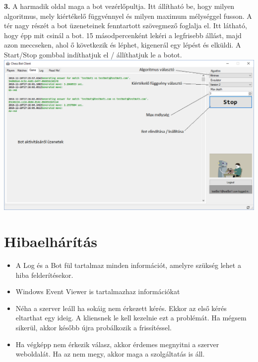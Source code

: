\documentclass[twoside, a4paper, 12pt]{book}
\begin{document}
\noindent \textbf{3.} A harmadik oldal maga a bot vezérlőpultja. Itt állítható be, hogy milyen algoritmus, mely kiértékelő függvénnyel és milyen maximum mélységgel fusson. A tér nagy részét a bot üzeneteinek fenntartott szövegmező foglalja el. Itt látható, hogy épp mit csinál a bot. 15 másodpercenként lekéri a legfrisebb állást, majd azon meccseken, ahol ő következik és léphet, kigenerál egy lépést és elküldi. A Start/Stop gombbal indíthatjuk el / állíthatjuk le a botot. \\
\includegraphics[width=1.0\textwidth]{img/botClient_3.png} \\

\section{Hibaelhárítás}
\begin{itemize}
	\item A Log és a Bot fül tartalmaz minden információt, amelyre szükség lehet a hiba felderítésekor.
	\item Windows Event Viewer is tartalmazhaz információkat
	\item Néha a szerver leáll ha sokáig nem érkezett kérés. Ekkor az első kérés eltarthat egy ideig. A kliensnek le kell kezelnie ezt a problémát. Ha mégsem sikerül, akkor később újra probálkozik a frissítéssel.
	\item Ha végképp nem érkezik válasz, akkor érdemes megnyitni a szerver weboldalát. Ha az nem megy, akkor maga a szolgáltatás is áll.
\end{itemize}
\end{document}
